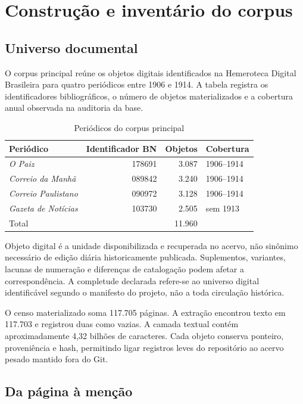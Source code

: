 \chapter{Construção e inventário do corpus}

\section{Universo documental}

O corpus principal reúne os objetos digitais identificados na Hemeroteca Digital Brasileira para quatro periódicos entre 1906 e 1914. A tabela registra os identificadores bibliográficos, o número de objetos materializados e a cobertura anual observada na auditoria da base.

\begin{table}[ht]
\centering
\caption{Periódicos do corpus principal}
\begin{tabular}{lrrl}
\toprule
Periódico & Identificador BN & Objetos & Cobertura \\
\midrule
\textit{O Paiz} & 178691 & 3.087 & 1906--1914 \\
\textit{Correio da Manhã} & 089842 & 3.240 & 1906--1914 \\
\textit{Correio Paulistano} & 090972 & 3.128 & 1906--1914 \\
\textit{Gazeta de Notícias} & 103730 & 2.505 & sem 1913 \\
\midrule
Total & & 11.960 & \\
\bottomrule
\end{tabular}
\end{table}

Objeto digital é a unidade disponibilizada e recuperada no acervo, não sinônimo necessário de edição diária historicamente publicada. Suplementos, variantes, lacunas de numeração e diferenças de catalogação podem afetar a correspondência. A completude declarada refere-se ao universo digital identificável segundo o manifesto do projeto, não a toda circulação histórica.

O censo materializado soma 117.705 páginas. A extração encontrou texto em 117.703 e registrou duas como vazias. A camada textual contém aproximadamente 4,32 bilhões de caracteres. Cada objeto conserva ponteiro, proveniência e hash, permitindo ligar registros leves do repositório ao acervo pesado mantido fora do Git.

\section{Da página à menção}

